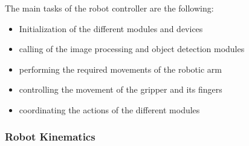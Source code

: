The main tasks of the robot controller are the following:

\begin{itemize}
    \item Initialization of the different modules and devices
    \item calling of the image processing and object detection modules
    \item performing the required movements of the robotic arm
    \item controlling the movement of the gripper and its fingers
    \item coordinating the actions of the different modules
\end{itemize}







\subsubsection{Robot Kinematics}


